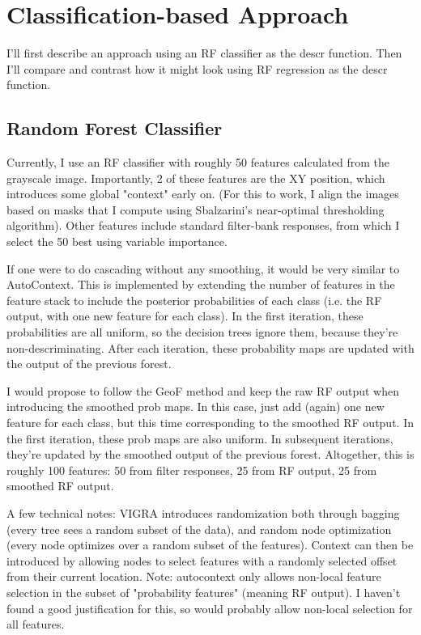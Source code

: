 \documentclass[10pt,twocolumn,letterpaper]{article}
\begin{document}
\section{Classification-based Approach}

I'll first describe an approach using an RF classifier as the descr function.  Then I'll compare and contrast how it might look using RF regression as the descr function.

\subsection{Random Forest Classifier}

Currently, I use an RF classifier with roughly 50 features calculated from the grayscale image.  Importantly, 2 of these features are the XY position, which introduces some global "context" early on.  (For this to work, I align the images based on masks that I compute using Sbalzarini's near-optimal thresholding algorithm).  Other features include standard filter-bank responses, from which I select the 50 best using variable importance.

If one were to do cascading without any smoothing, it would be very similar to AutoContext.  This is implemented by extending the number of features in the feature stack to include the posterior probabilities of each class (i.e. the RF output, with one new feature for each class).  In the first iteration, these probabilities are all uniform, so the decision trees ignore them, because they're non-descriminating.  After each iteration, these probability maps are updated with the output of the previous forest.

I would propose to follow the GeoF method and keep the raw RF output when introducing the smoothed prob maps.  In this case, just add (again) one new feature for each class, but this time corresponding to the smoothed RF output.  In the first iteration, these prob maps are also uniform.  In subsequent iterations, they're updated by the smoothed output of the previous forest.  Altogether, this is roughly 100 features: 50 from filter responses, 25 from RF output, 25 from smoothed RF output.

A few technical notes: VIGRA introduces randomization both through bagging (every tree sees a random subset of the data), and random node optimization (every node optimizes over a random subset of the features).  Context can then be introduced by allowing nodes to select features with a randomly selected offset from their current location.  Note: autocontext only allows non-local feature selection in the subset of "probability features" (meaning RF output).  I haven't found a good justification for this, so would probably allow non-local selection for all features.
\end{document}

